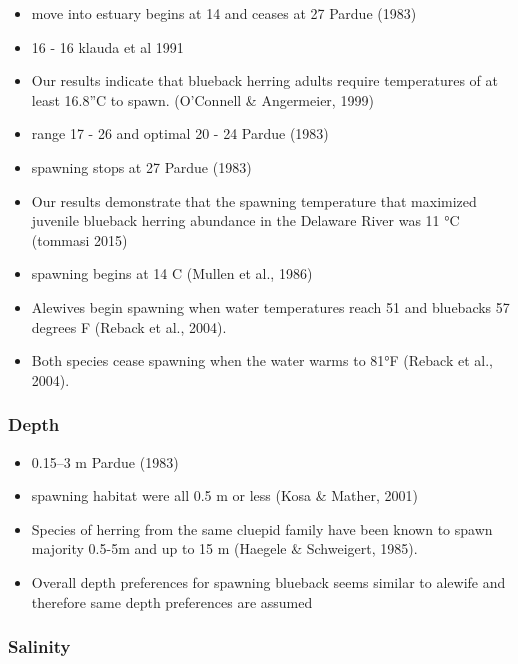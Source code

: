 \documentclass[
]{book}
\providecommand{\tightlist}{%
  \setlength{\itemsep}{0pt}\setlength{\parskip}{0pt}}
\begin{document}
\begin{itemize}
\item
  move into estuary begins at 14 and ceases at 27 Pardue (1983)
\item
  16 - 16 klauda et al 1991
\item
  Our results indicate that blueback herring adults require temperatures of at least 16.8''C to spawn. (O'Connell \& Angermeier, 1999)
\item
  range 17 - 26 and optimal 20 - 24 Pardue (1983)
\item
  spawning stops at 27 Pardue (1983)
\item
  Our results demonstrate that the spawning temperature that maximized juvenile blueback herring abundance in the Delaware River was 11 °C (tommasi 2015)
\item
  spawning begins at 14 C (Mullen et al., 1986)
\item
  Alewives begin spawning when water temperatures reach 51 and bluebacks 57 degrees F (Reback et al., 2004).
\item
  Both species cease spawning when the water warms to 81°F (Reback et al., 2004).
\end{itemize}

\hypertarget{depth-3}{%
\subsubsection{Depth}\label{depth-3}}

\begin{itemize}
\tightlist
\item
  0.15--3 m Pardue (1983)
\item
  spawning habitat were all 0.5 m or less (Kosa \& Mather, 2001)
\item
  Species of herring from the same cluepid family have been known to spawn majority 0.5-5m and up to 15 m (Haegele \& Schweigert, 1985).
\item
  Overall depth preferences for spawning blueback seems similar to alewife and therefore same depth preferences are assumed
\end{itemize}

\hypertarget{salinity-3}{%
\subsubsection{Salinity}\label{salinity-3}}
\end{document}
